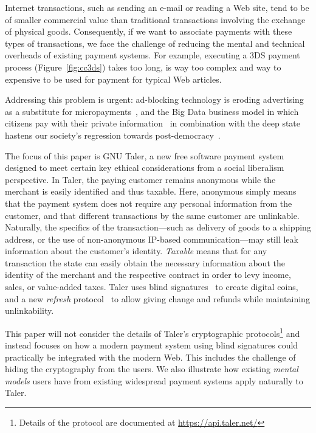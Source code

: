 \documentclass{llncs}
\begin{document}
Internet transactions, such as sending an e-mail or reading a Web
site, tend to be of smaller commercial value than traditional
transactions involving the exchange of physical goods.  Consequently,
if we want to associate payments with these types of transactions, we
face the challenge of reducing the mental and technical overheads of
existing payment systems.  For example, executing a 3DS payment
process (Figure~\ref{fig:cc3ds}) takes too long, is way too complex
and way to expensive to be used for payment for typical Web articles.

Addressing this problem is urgent: ad-blocking technology is eroding
advertising as a substitute for micropayments~\cite{adblockblocks},
and the Big Data business model in which citizens pay with their
private information~\cite{ehrenberg2014data} in combination with the
deep state hastens our society's regression towards
post-democracy~\cite{rms2013democracy}.


The focus of this paper is GNU Taler, a new free software payment
system designed to meet certain key ethical considerations from a
social liberalism perspective. In Taler, the paying customer remains
anonymous while the merchant is easily identified and thus taxable.
Here, anonymous simply means that the payment system does not require
any personal information from the customer, and that different
transactions by the same customer are unlinkable.  Naturally, the
specifics of the transaction---such as delivery of goods to a shipping
address, or the use of non-anonymous IP-based communication---may
still leak information about the customer's identity.  {\em Taxable}
means that for any transaction the state can easily obtain the
necessary information about the identity of the merchant and the
respective contract in order to levy income, sales, or value-added
taxes. Taler uses blind signatures~\cite{chaum1983blind} to create
digital coins, and a new {\em refresh} protocol~\cite{talercrypto} to
allow giving change and refunds while maintaining unlinkability.

This paper will not consider the details of Taler's cryptographic
protocols\footnote{Details of the protocol are documented at 
\url{https://api.taler.net/}} %
and instead focuses on how a modern payment system using 
blind signatures could practically be integrated with the modern Web.
This includes the challenge of hiding the cryptography from the users.
We also illustrate how existing {\em mental models} users have from
existing widespread payment systems apply naturally to Taler.
\end{document}
